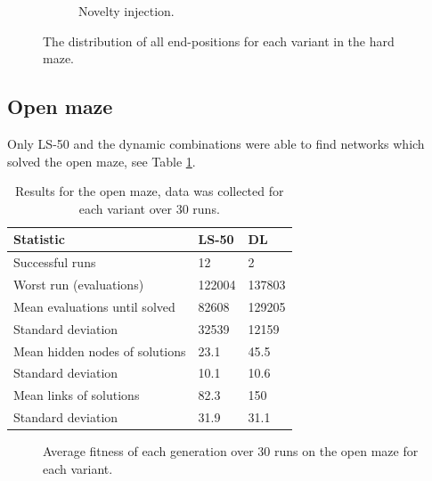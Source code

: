 \begin{figure}[H]
\begin{mdframed}
\begin{subfigure}[b]{0.5\textwidth}
            \caption{Novelty injection.}
        \end{subfigure}
    \end{mdframed}
    \caption{The distribution of all end-positions for each variant in the hard maze.}
    \label{distribution}
\end{figure}

\subsection{Open maze}
Only LS-50 and the dynamic combinations were able to find networks which solved the open maze, see Table \ref{open}.
\begin{table}[H]
    \centering
    \begin{tabular}{lll}
    \toprule
    Statistic & \multicolumn{1}{l}{LS-50} & \multicolumn{1}{l}{DL} \\
    \midrule
    Successful runs & 12 & 2 \\
    Worst run (evaluations) & 122004 & 137803 \\
    \rowcolor[gray]{.9} Mean evaluations until solved & 82608 & 129205 \\
    Standard deviation & 32539  & 12159 \\
    \rowcolor[gray]{.9} Mean hidden nodes of solutions & 23.1 & 45.5 \\
    Standard deviation & 10.1 & 10.6 \\
    \rowcolor[gray]{.9} Mean links of solutions & 82.3  & 150 \\
    Standard deviation & 31.9  & 31.1 \\
    \bottomrule
    \end{tabular}
    \caption{Results for the open maze, data was collected for each variant over 30 runs.}
    \label{open}
\end{table}

\begin{figure}[H]
    \begin{center}
        
    \end{center}
    \caption{Average fitness of each generation over 30 runs on the open maze for each variant.}
    \label{hard_fitness}
\end{figure}

